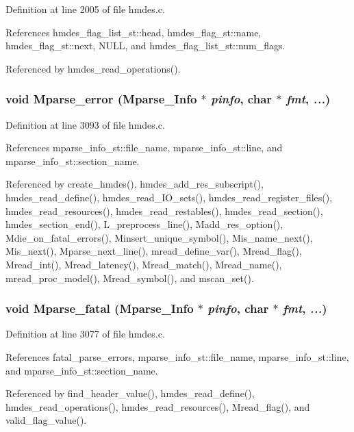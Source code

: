 Definition at line 2005 of file hmdes.c.

References hmdes\_\-flag\_\-list\_\-st::head, hmdes\_\-flag\_\-st::name, hmdes\_\-flag\_\-st::next, NULL, and hmdes\_\-flag\_\-list\_\-st::num\_\-flags.

Referenced by hmdes\_\-read\_\-operations().
\subsubsection{\setlength{\rightskip}{0pt plus 5cm}void Mparse\_\-error (\bf{Mparse\_\-Info} $\ast$ {\em pinfo}, char $\ast$ {\em fmt},  {\em ...})}\label{hmdes_8c_de1ca8ab012e8d317504c9c9b16f566d}




Definition at line 3093 of file hmdes.c.

References mparse\_\-info\_\-st::file\_\-name, mparse\_\-info\_\-st::line, and mparse\_\-info\_\-st::section\_\-name.

Referenced by create\_\-hmdes(), hmdes\_\-add\_\-res\_\-subscript(), hmdes\_\-read\_\-define(), hmdes\_\-read\_\-IO\_\-sets(), hmdes\_\-read\_\-register\_\-files(), hmdes\_\-read\_\-resources(), hmdes\_\-read\_\-restables(), hmdes\_\-read\_\-section(), hmdes\_\-section\_\-end(), L\_\-preprocess\_\-line(), Madd\_\-res\_\-option(), Mdie\_\-on\_\-fatal\_\-errors(), Minsert\_\-unique\_\-symbol(), Mis\_\-name\_\-next(), Mis\_\-next(), Mparse\_\-next\_\-line(), mread\_\-define\_\-var(), Mread\_\-flag(), Mread\_\-int(), Mread\_\-latency(), Mread\_\-match(), Mread\_\-name(), mread\_\-proc\_\-model(), Mread\_\-symbol(), and mscan\_\-set().
\subsubsection{\setlength{\rightskip}{0pt plus 5cm}void Mparse\_\-fatal (\bf{Mparse\_\-Info} $\ast$ {\em pinfo}, char $\ast$ {\em fmt},  {\em ...})}\label{hmdes_8c_2b6eb17357b8952a79a4e3d4ce84a2ae}




Definition at line 3077 of file hmdes.c.

References fatal\_\-parse\_\-errors, mparse\_\-info\_\-st::file\_\-name, mparse\_\-info\_\-st::line, and mparse\_\-info\_\-st::section\_\-name.

Referenced by find\_\-header\_\-value(), hmdes\_\-read\_\-define(), hmdes\_\-read\_\-operations(), hmdes\_\-read\_\-resources(), Mread\_\-flag(), and valid\_\-flag\_\-value().
